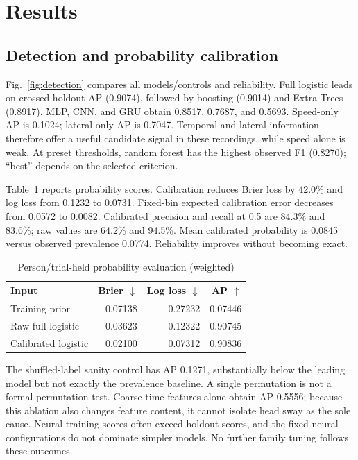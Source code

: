 \documentclass[conference]{IEEEtran}
\begin{document}
\section{Results}
\subsection{Detection and probability calibration}
Fig.~\ref{fig:detection} compares all models/controls and reliability. Full logistic leads on crossed-holdout AP (0.9074), followed by boosting (0.9014) and Extra Trees (0.8917). MLP, CNN, and GRU obtain 0.8517, 0.7687, and 0.5693. Speed-only AP is 0.1024; lateral-only AP is 0.7047. Temporal and lateral information therefore offer a useful candidate signal in these recordings, while speed alone is weak. At preset thresholds, random forest has the highest observed F1 (0.8270); ``best'' depends on the selected criterion.


Table~\ref{tab:calibration} reports probability scores. Calibration reduces Brier loss by 42.0\% and log loss from 0.1232 to 0.0731. Fixed-bin expected calibration error decreases from 0.0572 to 0.0082. Calibrated precision and recall at 0.5 are 84.3\% and 83.6\%; raw values are 64.2\% and 94.5\%. Mean calibrated probability is 0.0845 versus observed prevalence 0.0774. Reliability improves without becoming exact.

\begin{table}[t]\centering
\caption{Person/trial-held probability evaluation (weighted)}\label{tab:calibration}
\begin{tabular}{lrrr}\toprule Input & Brier $\downarrow$ & Log loss $\downarrow$ & AP $\uparrow$\\\midrule
Training prior & 0.07138 & 0.27232 & 0.07446\\
Raw full logistic & 0.03623 & 0.12322 & 0.90745\\
Calibrated logistic & 0.02100 & 0.07312 & 0.90836\\\bottomrule
\end{tabular}\end{table}

The shuffled-label sanity control has AP 0.1271, substantially below the leading model but not exactly the prevalence baseline. A single permutation is not a formal permutation test. Coarse-time features alone obtain AP 0.5556; because this ablation also changes feature content, it cannot isolate head sway as the sole cause. Neural training scores often exceed holdout scores, and the fixed neural configurations do not dominate simpler models. No further family tuning follows these outcomes.
\end{document}
